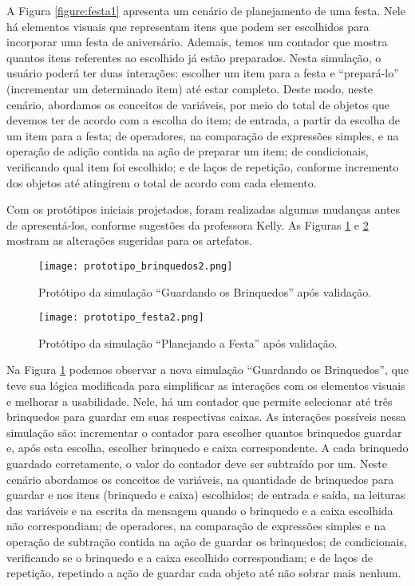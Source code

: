 A Figura \ref{figure:festa1} apresenta um cenário de planejamento de uma festa. Nele há elementos visuais que representam itens que podem ser escolhidos para incorporar uma festa de aniversário. Ademais, temos um contador que mostra quantos itens referentes ao escolhido já estão preparados. Nesta simulação, o usuário poderá ter duas interações: escolher um item para a festa e \enquote{prepará-lo} (incrementar um determinado item) até estar completo. Deste modo, neste cenário, abordamos os conceitos de variáveis, por meio do total de objetos que devemos ter de acordo com a escolha do item; de entrada, a partir da escolha de um item para a festa; de operadores, na comparação de expressões simples, e na operação de adição contida na ação de preparar um item; de condicionais, verificando qual item foi escolhido; e de laços de repetição, conforme incremento dos objetos até atingirem o total de acordo com cada elemento.

Com os protótipos iniciais projetados, foram realizadas algumas mudanças antes de apresentá-los, conforme sugestões da professora Kelly. As Figuras \ref{figure:brinquedos2} e \ref{figure:festa2} mostram as alterações sugeridas para os artefatos.

\begin{figure}[h!]
    \centering
    \texttt{[image: prototipo\_brinquedos2.png]}
    \caption{Protótipo da simulação \enquote{Guardando os Brinquedos} após validação.}
    \label{figure:brinquedos2}
\end{figure}

\begin{figure}[h!]
    \centering
    \texttt{[image: prototipo\_festa2.png]}
    \caption{Protótipo da simulação \enquote{Planejando a Festa} após validação.}
    \label{figure:festa2}
\end{figure}

Na Figura \ref{figure:brinquedos2} podemos observar a nova simulação \enquote{Guardando os Brinquedos}, que teve sua lógica modificada para simplificar as interações com os elementos visuais e melhorar a usabilidade. Nele, há um contador que permite selecionar até três brinquedos para guardar em suas respectivas caixas. As interações possíveis nessa simulação são: incrementar o contador para escolher quantos brinquedos guardar e, após esta escolha, escolher brinquedo e caixa correspondente. A cada brinquedo guardado corretamente, o valor do contador deve ser subtraído por um. Neste cenário abordamos os conceitos de variáveis, na quantidade de brinquedos para guardar e nos itens (brinquedo e caixa) escolhidos; de entrada e saída, na leituras das variáveis e na escrita da mensagem quando o brinquedo e a caixa escolhida não correspondiam; de operadores, na comparação de expressões simples e na operação de subtração contida na ação de guardar os brinquedos; de condicionais, verificando se o brinquedo e a caixa escolhido correspondiam; e de laços de repetição, repetindo a ação de guardar cada objeto até não sobrar mais nenhum.

